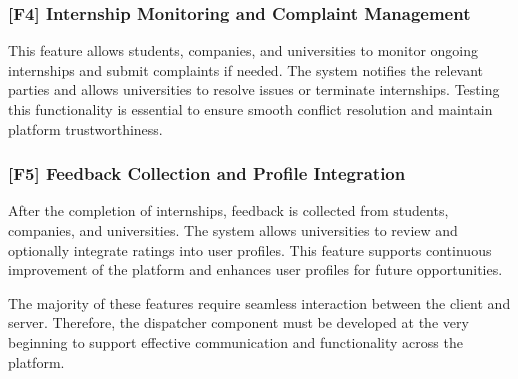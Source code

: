 \subsubsection*{[F4] Internship Monitoring and Complaint Management}
This feature allows students, companies, and universities to monitor ongoing internships and submit complaints if needed. The system notifies the relevant parties and allows universities to resolve issues or terminate internships. Testing this functionality is essential to ensure smooth conflict resolution and maintain platform trustworthiness.

\subsubsection*{[F5] Feedback Collection and Profile Integration}
After the completion of internships, feedback is collected from students, companies, and universities. The system allows universities to review and optionally integrate ratings into user profiles. This feature supports continuous improvement of the platform and enhances user profiles for future opportunities.

The majority of these features require seamless interaction between the client and server. Therefore, the dispatcher component must be developed at the very beginning to support effective communication and functionality across the platform.